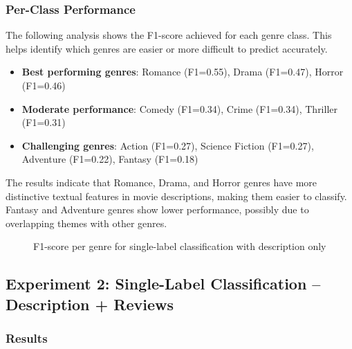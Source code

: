 \documentclass[12pt,a4paper]{article}
\begin{document}
\subsubsection{Per-Class Performance}

The following analysis shows the F1-score achieved for each genre class. This helps identify which genres are easier or more difficult to predict accurately.

\begin{itemize}
    \item \textbf{Best performing genres}: Romance (F1=0.55), Drama (F1=0.47), Horror (F1=0.46)
    \item \textbf{Moderate performance}: Comedy (F1=0.34), Crime (F1=0.34), Thriller (F1=0.31)
    \item \textbf{Challenging genres}: Action (F1=0.27), Science Fiction (F1=0.27), Adventure (F1=0.22), Fantasy (F1=0.18)
\end{itemize}

The results indicate that Romance, Drama, and Horror genres have more distinctive textual features in movie descriptions, making them easier to classify. Fantasy and Adventure genres show lower performance, possibly due to overlapping themes with other genres.

\begin{figure}[h]
\centering
{}
\caption{F1-score per genre for single-label classification with description only}
\label{fig:exp1_per_class}
\end{figure}

\subsection{Experiment 2: Single-Label Classification -- Description + Reviews}

\subsubsection{Results}
\end{document}
